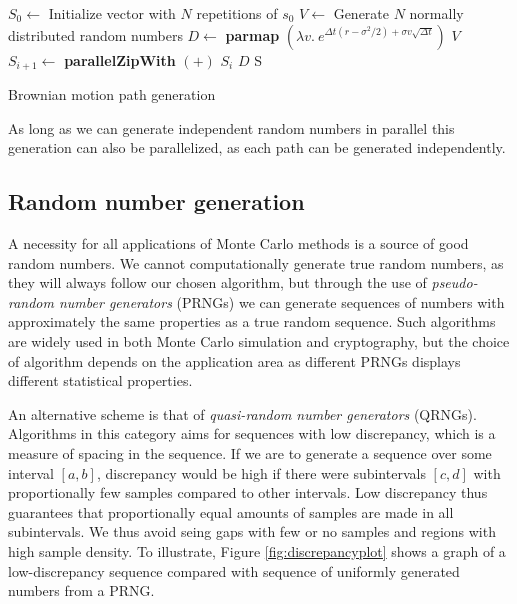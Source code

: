 \begin{algorithm}
  \begin{algorithmic}
    \State $S_0 \gets$ Initialize vector with $N$ repetitions of $s_0$
      \State $V \gets$ Generate $N$ normally distributed random numbers
      \State $D \gets$ \textbf{parmap} $(\lambda v.\ e^{\Delta t(r-\sigma^2/2) + \sigma v\sqrt{\Delta t}})$ $V$
      \State $S_{i+1} \gets$ \textbf{parallelZipWith} $(+)$ $S_{i}$ $D$
    \EndFor
    \State \Return S
    \EndFunction
  \end{algorithmic}
  \caption{Brownian motion path generation}
  \label{alg:lsm-pathgeneration}
\end{algorithm}


As long as we can generate independent random numbers in parallel this
generation can also be parallelized, as each path can be generated
independently.

\subsection{Random number generation}
A necessity for all applications of Monte Carlo methods is a source of
good random numbers. We cannot computationally generate true random
numbers, as they will always follow our chosen algorithm, but through
the use of \emph{pseudo-random number generators} (PRNGs) we can
generate sequences of numbers with approximately the same properties
as a true random sequence. Such algorithms are widely used in both
Monte Carlo simulation and cryptography, but the choice of algorithm
depends on the application area as different PRNGs displays different
statistical properties.

An alternative scheme is that of \emph{quasi-random number generators}
(QRNGs). Algorithms in this category aims for sequences with low
discrepancy, which is a measure of spacing in the sequence. If we are
to generate a sequence over some interval $[a,b]$, discrepancy would
be high if there were subintervals $[c,d]$ with proportionally few
samples compared to other intervals. Low discrepancy thus guarantees
that proportionally equal amounts of samples are made in all
subintervals. We thus avoid seing gaps with few or no samples and
regions with high sample density. To illustrate, Figure
\ref{fig:discrepancyplot} shows a graph of a low-discrepancy sequence
compared with sequence of uniformly generated numbers from a PRNG.

